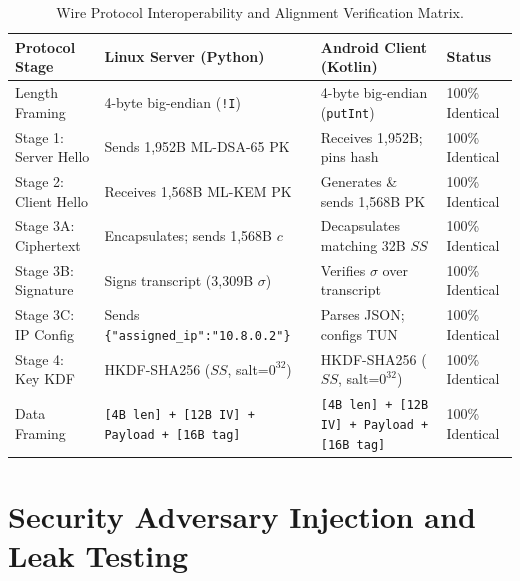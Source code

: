 \begin{table}[htbp]
  \centering
  \small
  \setlength{\tabcolsep}{3pt}
  \caption{Wire Protocol Interoperability and Alignment Verification Matrix.}
  \label{tab:wire_interop_matrix}
  \begin{tabularx}{\linewidth}{@{}p{2.6cm}YYp{2.2cm}@{}}
    \toprule
    \textbf{Protocol Stage} & \textbf{Linux Server (Python)} & \textbf{Android Client (Kotlin)} & \textbf{Status} \\
    \midrule
    Length Framing & 4-byte big-endian (\texttt{!I}) & 4-byte big-endian (\texttt{putInt}) & 100\% Identical \\
    Stage 1: Server Hello & Sends 1,952B ML-DSA-65 PK & Receives 1,952B; pins hash & 100\% Identical \\
    Stage 2: Client Hello & Receives 1,568B ML-KEM PK & Generates \& sends 1,568B PK & 100\% Identical \\
    Stage 3A: Ciphertext & Encapsulates; sends 1,568B $c$ & Decapsulates matching 32B $SS$ & 100\% Identical \\
    Stage 3B: Signature & Signs transcript (3,309B $\sigma$) & Verifies $\sigma$ over transcript & 100\% Identical \\
    Stage 3C: IP Config & Sends \texttt{\{"assigned\_}\allowbreak\texttt{ip":}\allowbreak\texttt{"10.8.0.2"\}} & Parses JSON; configs TUN & 100\% Identical \\
    Stage 4: Key KDF & HKDF-SHA256 ($SS$, salt=$0^{32}$) & HKDF-SHA256 ($SS$, salt=$0^{32}$) & 100\% Identical \\
    Data Framing & \texttt{[4B len] + [12B IV] + Payload + [16B tag]} & \texttt{[4B len] + [12B IV] + Payload + [16B tag]} & 100\% Identical \\
    \bottomrule
  \end{tabularx}
\end{table}

\section{Security Adversary Injection and Leak Testing}
\label{sec:security_adversary_testing}

